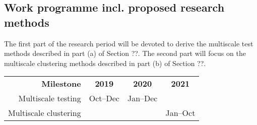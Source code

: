 \documentclass[a4paper,12pt]{article}
\begin{document}
\begin{itemize}[label=--,leftmargin=0.5cm]


\subsection{Work programme incl. proposed research methods}


The first part of the research period will be devoted to derive the multiscale test methods described in part (a) of Section ??. The second part will focus on the multiscale clustering methods described in part (b) of Section ??. 

\begin{center}
\begin{tabular}{r c c c}
{\bf Milestone} & {\bf 2019} & {\bf 2020} & {\bf 2021} \\
Multiscale testing & Oct--Dec & Jan--Dec & \\
Multiscale clustering & & & Jan--Oct
\end{tabular}
\end{center}






\end{itemize}
\end{document}
